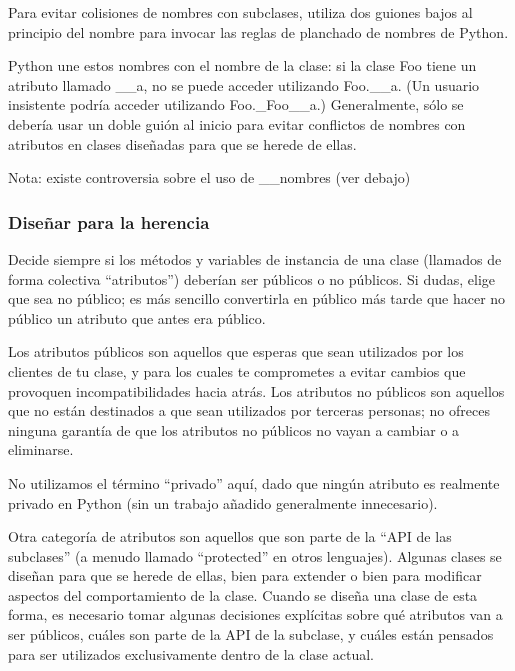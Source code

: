 \documentclass[a4paper,11pt,oneside]{book}
\begin{document}
Para evitar colisiones de nombres con subclases, utiliza dos guiones bajos al principio del nombre para invocar las reglas de planchado de nombres de Python.

Python une estos nombres con el nombre de la clase: si la clase Foo tiene un atributo llamado \_\_a, no se puede acceder utilizando Foo.\_\_a. (Un usuario insistente podría acceder utilizando Foo.\_Foo\_\_a.) Generalmente, sólo se debería usar un doble guión al inicio para evitar conflictos de nombres con atributos en clases diseñadas para que se herede de ellas.

Nota: existe controversia sobre el uso de \_\_nombres (ver debajo)
\subsubsection{Diseñar para la herencia}
Decide siempre si los métodos y variables de instancia de una clase (llamados de forma colectiva ``atributos'') deberían ser públicos o no públicos. Si dudas, elige que sea no público; es más sencillo convertirla en público más tarde que hacer no público un atributo que antes era público.

Los atributos públicos son aquellos que esperas que sean utilizados por los clientes de tu clase, y para los cuales te comprometes a evitar cambios que provoquen incompatibilidades hacia atrás. Los atributos no públicos son aquellos que no están destinados a que sean utilizados por terceras personas; no ofreces ninguna garantía de que los atributos no públicos no vayan a cambiar o a eliminarse.

No utilizamos el término ``privado'' aquí, dado que ningún atributo es realmente privado en Python (sin un trabajo añadido generalmente innecesario).

Otra categoría de atributos son aquellos que son parte de la ``API de las subclases'' (a menudo llamado ``protected'' en otros lenguajes). Algunas clases se diseñan para que se herede de ellas, bien para extender o bien para modificar aspectos del comportamiento de la clase. Cuando se diseña una clase de esta forma, es necesario tomar algunas decisiones explícitas sobre qué atributos van a ser públicos, cuáles son parte de la API de la subclase, y cuáles están pensados para ser utilizados exclusivamente dentro de la clase actual.
\end{document}
